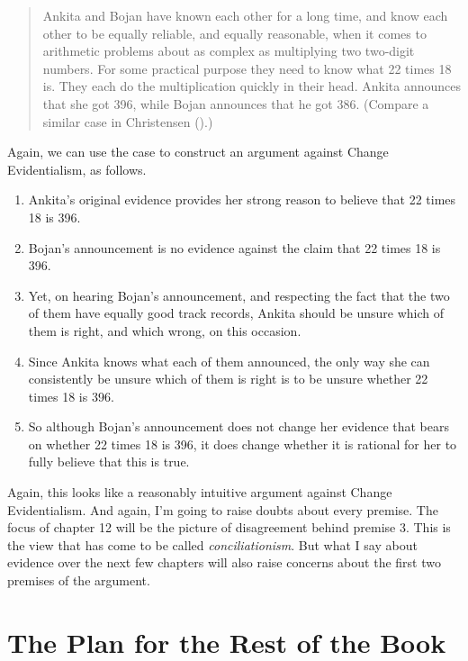\documentclass[
  10pt,
  letterpaper,
  twoside]{scrbook}
\providecommand{\tightlist}{%
  \setlength{\itemsep}{0pt}\setlength{\parskip}{0pt}}\usepackage{longtable,booktabs,array}
\begin{document}
\begin{quote}
{Ankita} and {Bojan} have known each other for a long time, and know
each other to be equally reliable, and equally reasonable, when it comes
to arithmetic problems about as complex as multiplying two two-digit
numbers. For some practical purpose they need to know what 22 times 18
is. They each do the multiplication quickly in their head. {Ankita}
announces that she got 396, while {Bojan} announces that he got 386.
(Compare a similar case in Christensen
().)
\end{quote}

Again, we can use the case to construct an argument against Change
Evidentialism, as follows.

\begin{enumerate}
\def\labelenumi{\arabic{enumi}.}
\tightlist
\item
  {Ankita}'s original evidence provides her strong reason to believe
  that 22 times 18 is 396.
\item
  {Bojan}'s announcement is no evidence against the claim that 22 times
  18 is 396.
\item
  Yet, on hearing {Bojan}'s announcement, and respecting the fact that
  the two of them have equally good track records, {Ankita} should be
  unsure which of them is right, and which wrong, on this occasion.
\item
  Since {Ankita} knows what each of them announced, the only way she can
  consistently be unsure which of them is right is to be unsure whether
  22 times 18 is 396.
\item
  So although {Bojan}'s announcement does not change her evidence that
  bears on whether 22 times 18 is 396, it does change whether it is
  rational for her to fully believe that this is true.
\end{enumerate}

Again, this looks like a reasonably intuitive argument against Change
Evidentialism. And again, I'm going to raise doubts about every premise.
The focus of chapter 12 will be the picture of disagreement behind
premise 3. This is the view that has come to be called
\emph{conciliationism}. But what I say about evidence over the next few
chapters will also raise concerns about the first two premises of the
argument.

\section{The Plan for the Rest of the
Book}\label{theplanfortherestofthebook}
\end{document}
